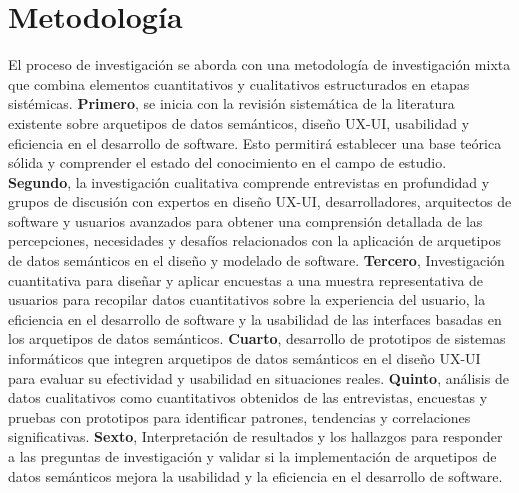 \documentclass[12pt,a4paper]{article}
\begin{document}
\section{Metodología}
\label{sec:11}
El proceso de investigación se aborda con una metodología de investigación mixta que combina elementos cuantitativos y cualitativos estructurados en etapas sistémicas. \textbf{Primero}, se inicia con la revisión sistemática de la literatura existente sobre arquetipos de datos semánticos, diseño UX-UI, usabilidad y eficiencia en el desarrollo de software. Esto permitirá establecer una base teórica sólida y comprender el estado del conocimiento en el campo de estudio. \textbf{Segundo}, la investigación cualitativa comprende entrevistas en profundidad y grupos de discusión con expertos en diseño UX-UI, desarrolladores, arquitectos de software y usuarios avanzados para obtener una comprensión detallada de las percepciones, necesidades y desafíos relacionados con la aplicación de arquetipos de datos semánticos en el diseño y modelado de software. \textbf{Tercero}, Investigación cuantitativa para diseñar y aplicar encuestas a una muestra representativa de usuarios para recopilar datos cuantitativos sobre la experiencia del usuario, la eficiencia en el desarrollo de software y la usabilidad de las interfaces basadas en los arquetipos de datos semánticos. \textbf{Cuarto}, desarrollo de prototipos de sistemas informáticos que integren arquetipos de datos semánticos en el diseño UX-UI para evaluar su efectividad y usabilidad en situaciones reales. \textbf{Quinto}, análisis de datos cualitativos como cuantitativos obtenidos de las entrevistas, encuestas y pruebas con prototipos para identificar patrones, tendencias y correlaciones significativas. \textbf{Sexto}, Interpretación de resultados y los hallazgos para responder a las preguntas de investigación y validar si la implementación de arquetipos de datos semánticos mejora la usabilidad y la eficiencia en el desarrollo de software.
\end{document}

